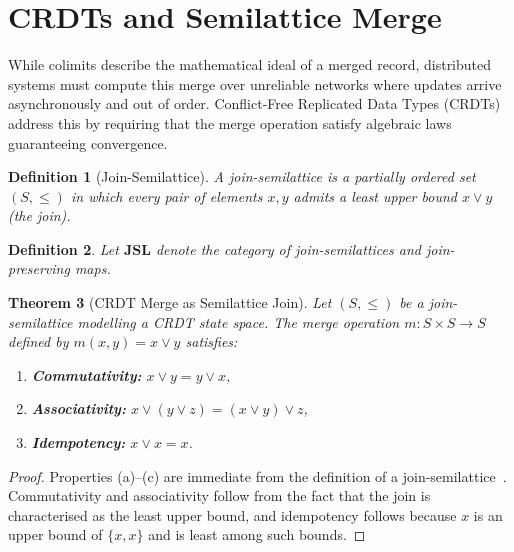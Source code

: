 \documentclass[11pt,a4paper]{article}
\newtheorem{definition}{Definition}[section]
\newtheorem{theorem}[definition]{Theorem}
\begin{document}
\section{CRDTs and Semilattice Merge}
\label{sec:crdt}

While colimits describe the mathematical ideal of a merged record,
distributed systems must compute this merge over unreliable networks
where updates arrive asynchronously and out of order. Conflict-Free
Replicated Data Types (CRDTs)~\citep{shapiro2011} address this by
requiring that the merge operation satisfy algebraic laws guaranteeing
convergence.

\begin{definition}[Join-Semilattice]
\label{def:join-semilattice}
A \emph{join-semilattice} is a partially ordered set $(S,\le)$ in which
every pair of elements $x,y$ admits a least upper bound $x\vee y$
(the \emph{join}).
\end{definition}

\begin{definition}
\label{def:jsl}
Let $\mathbf{JSL}$ denote the category of join-semilattices and
join-preserving maps.
\end{definition}

\begin{theorem}[CRDT Merge as Semilattice Join]
\label{thm:crdt-merge}
Let $(S,\le)$ be a join-semilattice modelling a CRDT state space. The
merge operation $m:S\times S\to S$ defined by $m(x,y)=x\vee y$
satisfies:
\begin{enumerate}[label=(\alph*)]
  \item \textbf{Commutativity:} $x \vee y = y \vee x$,
  \item \textbf{Associativity:} $x \vee (y \vee z)
    = (x \vee y) \vee z$,
  \item \textbf{Idempotency:} $x \vee x = x$.
\end{enumerate}
\end{theorem}

\begin{proof}
Properties (a)--(c) are immediate from the definition of a
join-semilattice~\citep{shapiro2011}. Commutativity and associativity
follow from the fact that the join is characterised as the least upper
bound, and idempotency follows because $x$ is an upper bound of
$\{x,x\}$ and is least among such bounds.
\end{proof}
\end{document}
